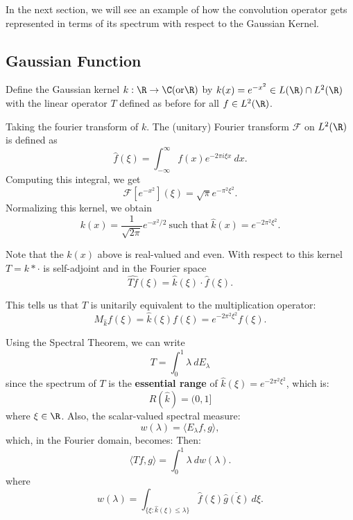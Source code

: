 In the next section, we will see an example of how the convolution operator gets represented in terms of its spectrum with respect to the Gaussian Kernel. 

\subsection{Gaussian Function}

Define the Gaussian kernel \( k: \R \to \C (\text{or} \R) \) by \( k(x) = e^{- x^{2}} \in L(\R) \cap L^{2}(\R)  \) with the linear operator \( T   \) defined as before for all \( f \in L^{2}(\R) \).
 
Taking the fourier transform of \( k  \). The (unitary) Fourier transform \( \mathcal{F} \) on \( L^{2}(\R) \) is defined as 
\[  \hat{f}(\xi) = \int_{ - \infty  }^{ \infty  }  f(x) e^{-2 \pi i \xi x } \ dx.  \]
Computing this integral, we get 
\[  \mathcal{F}[e^{- x^{2}}](\xi) = \sqrt{ \pi } e^{- \pi^{2} \xi^{2}}. \]
Normalizing this kernel, we obtain
\[  k(x) = \frac{ 1  }{ \sqrt{ 2 \pi  }  } e^{- x^{2} /2} \ \text{such that} \ \hat{k}(x) = e^{-2\pi^{2} \xi^{2}}. \]

Note that the \( k(x) \) above is real-valued and even. With respect to this kernel \( T = k * \cdot \) is self-adjoint and in the Fourier space
\[  \hat{Tf}(\xi) = \hat{k}(\xi) \cdot \hat{f}(\xi). \]

This tells us that \( T  \) is unitarily equivalent to the multiplication operator:
\[  {M}_{\hat{k}}f(\xi)  = \hat{k}(\xi)f(\xi) = e^{- 2 \pi^{2} \xi^{2}}f(\xi).\]

Using the Spectral Theorem, we can write
\[  T = \int_{ 0 }^{ 1 }  \lambda  \ d {E}_{\lambda}  \]
since the spectrum of \( T  \) is the \textbf{essential range} of \( \hat{k}(\xi) = e^{-2 \pi^{2} \xi^{2}} \), which is: 
\[  R(\hat{k}) = (0,1]  \]
where \( \xi \in \R  \). Also, the scalar-valued spectral measure:
\[  w(\lambda) = \langle {E}_{\lambda} f  ,  g  \rangle, \]
which, in the Fourier domain, becomes:
Then:
\[ \langle Tf  , g  \rangle = \int_{ 0 }^{ 1 }  \lambda  \ dw (\lambda). \]
where
\[ w(\lambda) = \int_{ \{  \xi : \hat{k}(\xi) \leq \lambda\}  } \hat{f}(\xi) \overline{\hat{g}(\xi)}   \ d \xi. \]


 


